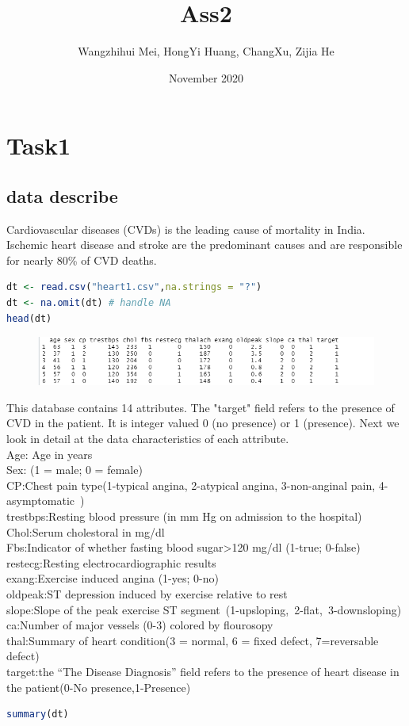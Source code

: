 \documentclass{article}
\title{Ass2}
\author{Wangzhihui Mei, HongYi Huang, ChangXu, Zijia He}
\date{November 2020}
\begin{document}
\maketitle
\section{Task1}
\subsection{data describe}
Cardiovascular diseases (CVDs) is the leading cause of mortality in India. Ischemic heart disease and stroke are the predominant causes and are responsible for nearly 80\% of CVD deaths. 

\begin{lstlisting}[language=R]
dt <- read.csv("heart1.csv",na.strings = "?")
dt <- na.omit(dt) # handle NA
head(dt)
\end{lstlisting} 

\begin{figure}[H]
  \centering
  \includegraphics[width=1\textwidth]{task1_1_dtHead.png} %
\end{figure}
This database contains 14 attributes. The "target" field refers to the presence of CVD in the patient. It is
integer valued 0 (no presence) or 1 (presence). Next we look in detail at the data characteristics of each attribute.
\\
Age: Age in years\\
Sex: (1 = male; 0 = female)\\
CP:Chest pain type(1-typical angina, 2-atypical angina, 3-non-anginal	pain, 4-asymptomatic )\\
trestbps:Resting blood pressure (in mm Hg on admission to the hospital)\\
Chol:Serum cholestoral in mg/dl\\
Fbs:Indicator of whether fasting blood sugar>120 mg/dl (1-true; 0-false)\\
restecg:Resting electrocardiographic results\\
exang:Exercise induced angina (1-yes; 0-no)\\
oldpeak:ST depression induced by exercise relative to rest\\
slope:Slope of the peak exercise ST segment (1-upsloping, 2-flat, 3-downsloping)\\
ca:Number of major vessels (0-3) colored by flourosopy\\
thal:Summary of heart condition(3 = normal, 6 = fixed defect, 7=reversable defect)\\
target:the “The Disease Diagnosis” field refers to the presence of heart disease in the patient(0-No presence,1-Presence) 
\begin{lstlisting}[language=R]
  summary(dt)
\end{lstlisting} 
  
\end{document}
